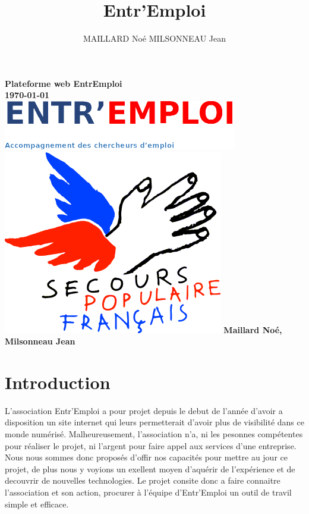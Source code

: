 \documentclass[a4paper, 12pt]{report}
\title{Entr'Emploi}
\author{MAILLARD Noé MILSONNEAU Jean}
\begin{document}
\begin{titlepage}
	\thispagestyle{empty}
    \centering
    {\bfseries\Large
    		Plateforme web EntrEmploi\\
        \today\\
        \vskip3cm
        \includegraphics{../../public/images/Logo-entremploi-md.png}
        \vskip15mm
        \includegraphics{../../public/images/Logo-spf.png}
        \vskip3cm
        Maillard Noé, Milsonneau Jean\\
    }
    \normalsize
\end{titlepage}

\tableofcontents
\newpage
\section*{Introduction}

L'association Entr'Emploi a pour projet depuis le debut de l'année d'avoir a disposition un site internet qui leurs permetterait d'avoir plus de visibilité
dans ce monde numérisé. Malheureusement, l'association n'a, ni les pesonnes compétentes pour réaliser le projet, ni l'argent pour faire appel aux services d'une entreprise.
Nous nous sommes donc proposés d'offir nos capacités pour mettre au jour ce projet, de plus nous y voyions un exellent moyen d'aquérir de l'expérience et de decouvrir de nouvelles technologies.
Le projet consite donc a faire connaitre l'association et son action, procurer à l'équipe d'Entr'Emploi un outil de travil simple et efficace.
\end{document}
